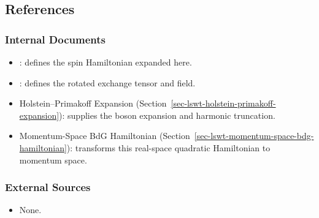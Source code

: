 \subsection{References}

\subsubsection{Internal Documents}

\begin{itemize}
\tightlist
\item
  : defines the spin Hamiltonian expanded here.
\item
  : defines the rotated exchange tensor and field.
\item
  Holstein--Primakoff Expansion (Section~\ref{sec-lswt-holstein-primakoff-expansion}): supplies the boson expansion and harmonic truncation.
\item
  Momentum-Space BdG Hamiltonian (Section~\ref{sec-lswt-momentum-space-bdg-hamiltonian}): transforms this real-space quadratic Hamiltonian to momentum space.
\end{itemize}

\subsubsection{External Sources}

\begin{itemize}
\tightlist
\item
  None.
\end{itemize}
